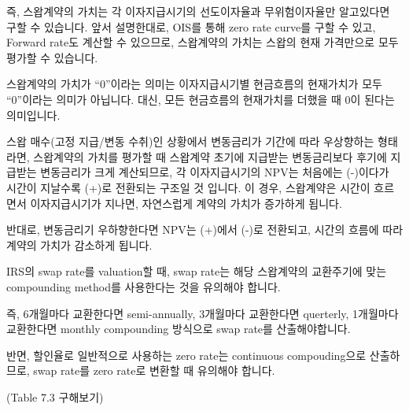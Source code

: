 \documentclass[
  letterpaper,
  DIV=11,
  numbers=noendperiod]{scrreprt}
\begin{document}
즉, 스왑계약의 가치는 각 이자지급시기의 선도이자율과 무위험이자율만
알고있다면 구할 수 있습니다. 앞서 설명한대로, OIS를 통해 zero rate
curve를 구할 수 있고, Forward rate도 계산할 수 있으므로, 스왑계약의
가치는 스왑의 현재 가격만으로 모두 평가할 수 있습니다.

\begin{tcolorbox}[enhanced jigsaw, titlerule=0mm, bottomtitle=1mm, left=2mm, title=\textcolor{quarto-callout-important-color}{\faExclamation}\hspace{0.5em}{How the value changes through time}, toptitle=1mm, bottomrule=.15mm, colframe=quarto-callout-important-color-frame, breakable, opacityback=0, rightrule=.15mm, opacitybacktitle=0.6, coltitle=black, colback=white, arc=.35mm, colbacktitle=quarto-callout-important-color!10!white, toprule=.15mm, leftrule=.75mm]

스왑계약의 가치가 ``0''이라는 의미는 이자지급시기별 현금흐름의
현재가치가 모두 ``0''이라는 의미가 아닙니다. 대신, 모든 현금흐름의
현재가치를 더했을 때 0이 된다는 의미입니다.

스왑 매수(고정 지급/변동 수취)인 상황에서 변동금리가 기간에 따라
우상향하는 형태라면, 스왑계약의 가치를 평가할 때 스왑계약 초기에
지급받는 변동금리보다 후기에 지급받는 변동금리가 크게 계산되므로, 각
이자지급시기의 NPV는 처음에는 (-)이다가 시간이 지날수록 (+)로 전환되는
구조일 것 입니다. 이 경우, 스왑계약은 시간이 흐르면서 이자지급시기가
지나면, 자연스럽게 계약의 가치가 증가하게 됩니다.

반대로, 변동금리기 우하향한다면 NPV는 (+)에서 (-)로 전환되고, 시간의
흐름에 따라 계약의 가치가 감소하게 됩니다.

\end{tcolorbox}

\begin{tcolorbox}[enhanced jigsaw, titlerule=0mm, bottomtitle=1mm, left=2mm, title=\textcolor{quarto-callout-important-color}{\faExclamation}\hspace{0.5em}{Difference in compounding methods}, toptitle=1mm, bottomrule=.15mm, colframe=quarto-callout-important-color-frame, breakable, opacityback=0, rightrule=.15mm, opacitybacktitle=0.6, coltitle=black, colback=white, arc=.35mm, colbacktitle=quarto-callout-important-color!10!white, toprule=.15mm, leftrule=.75mm]

IRS의 swap rate를 valuation할 때, swap rate는 해당 스왑계약의 교환주기에
맞는 compounding method를 사용한다는 것을 유의해야 합니다.

즉, 6개월마다 교환한다면 semi-annually, 3개월마다 교환한다면 querterly,
1개월마다 교환한다면 monthly compounding 방식으로 swap rate를
산출해야합니다.

반면, 할인율로 일반적으로 사용하는 zero rate는 continuous compouding으로
산출하므로, swap rate를 zero rate로 변환할 때 유의해야 합니다.

(Table 7.3 구해보기)

\end{tcolorbox}
\end{document}
